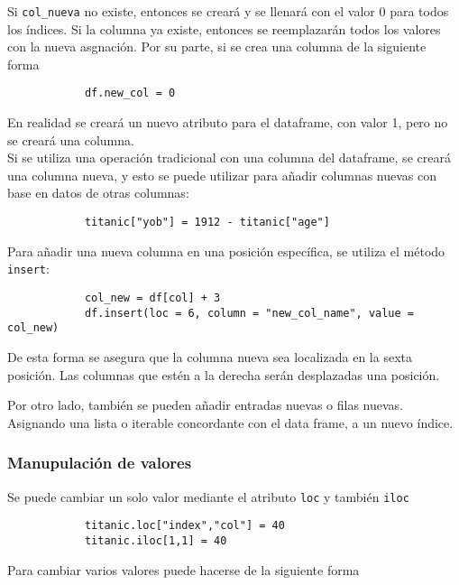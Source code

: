 Si \texttt{col\_nueva} no existe, entonces se creará y se llenará con el valor
0 para todos los índices. Si la columna ya existe, entonces se reemplazarán
todos los valores con la nueva asgnación. Por su parte, si se crea una columna
de la siguiente forma

\begin{verbatim}
            df.new_col = 0
            \end{verbatim}

En realidad se creará un nuevo atributo para el dataframe, con valor 1, pero no
se creará una columna.\\

Si se utiliza una operación tradicional con una columna del dataframe, se
creará una columna nueva, y esto se puede utilizar para añadir columnas nuevas
con base en datos de otras columnas:

\begin{verbatim}
            titanic["yob"] = 1912 - titanic["age"]
            \end{verbatim}

Para añadir una nueva columna en una posición específica, se utiliza el método
\texttt{insert}:

\begin{verbatim}
            col_new = df[col] + 3
            df.insert(loc = 6, column = "new_col_name", value = col_new)
            \end{verbatim}

De esta forma se asegura que la columna nueva sea localizada en la sexta
posición. Las columnas que estén a la derecha serán desplazadas una posición.

Por otro lado, también se pueden añadir entradas nuevas o filas nuevas.
Asignando una lista o iterable concordante con el data frame, a un nuevo
índice.

\subsubsection{Manupulación de valores}

Se puede cambiar un solo valor mediante el atributo \texttt{loc} y también
\texttt{iloc}

\begin{verbatim}
            titanic.loc["index","col"] = 40
            titanic.iloc[1,1] = 40
            \end{verbatim}

\noindent Para cambiar varios valores puede hacerse de la siguiente forma

